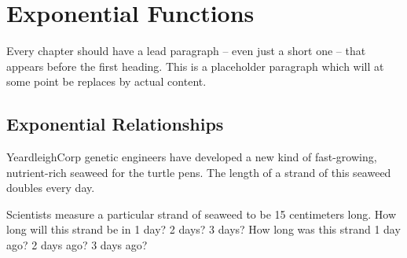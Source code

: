 \chapter{Exponential Functions}
\label{ch:expofunc}



Every chapter should have a lead paragraph -- even just a short one -- that appears before the first heading. This is a placeholder paragraph which will at some point be replaces by actual content.

%

\section{Exponential Relationships}
\label{sec:exporelationships}

\begin{boxedexplore}
YeardleighCorp genetic engineers have developed a new kind of fast-growing, nutrient-rich seaweed for the turtle pens. The length of a strand of this seaweed doubles every day.

Scientists measure a particular strand of seaweed to be 15 centimeters long. How long will this strand be in 1 day? 2 days? 3 days? How long was this strand 1 day ago? 2 days ago? 3 days ago?
\end{boxedexplore}

